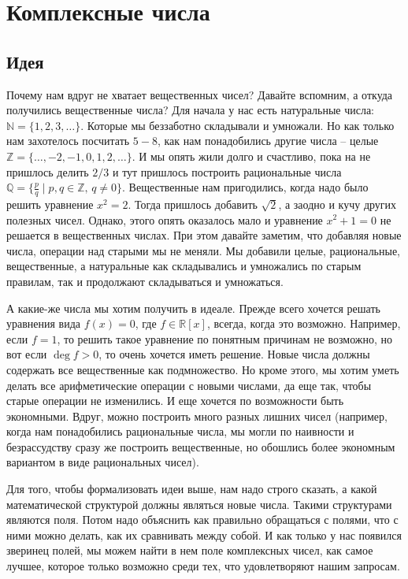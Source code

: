 \newpage
\section{Комплексные числа}

\subsection{Идея}

Почему нам вдруг не хватает вещественных чисел?
Давайте вспомним, а откуда получились вещественные числа?
Для начала у нас есть натуральные числа: $\mathbb N = \{1,2,3,\ldots\}$.
Которые мы беззаботно складывали и умножали.
Но как только нам захотелось посчитать $5 - 8$, как нам понадобились другие числа -- целые $\mathbb Z = \{\ldots, -2, -1,0,1,2,\ldots\}$.
И мы опять жили долго и счастливо, пока на не пришлось делить $2/3$ и тут пришлось построить рациональные числа $\mathbb Q = \{\frac{p}{q}\mid p,q\in \mathbb Z,\, q\neq 0\}$.
Вещественные нам пригодились, когда надо было решить уравнение $x^2 = 2$.
Тогда пришлось добавить $\sqrt{2}$, а заодно и кучу других полезных чисел.
Однако, этого опять оказалось мало и уравнение $x^2 +1 = 0$ не решается в вещественных числах.
При этом давайте заметим, что добавляя новые числа, операции над старыми мы не меняли.
Мы добавили целые, рациональные, вещественные, а натуральные как складывались и умножались по старым правилам, так и продолжают складываться и умножаться.

А какие-же числа мы хотим получить в идеале.
Прежде всего хочется решать уравнения вида $f(x) = 0$, где $f\in \mathbb R[x]$, всегда, когда это возможно.
Например, если $f = 1$, то решить такое уравнение по понятным причинам не возможно, но вот если $\deg f > 0$, то очень хочется иметь решение.
Новые числа должны содержать все вещественные как подмножество.
Но кроме этого, мы хотим уметь делать все арифметические операции с новыми числами, да еще так, чтобы старые операции не изменились.
И еще хочется по возможности быть экономными.
Вдруг, можно построить много разных лишних чисел (например, когда нам понадобились рациональные числа, мы могли по наивности и безрассудству сразу же построить вещественные, но обошлись более экономным вариантом в виде рациональных чисел).

Для того, чтобы формализовать идеи выше, нам надо строго сказать, а какой математической структурой должны являться новые числа.
Такими структурами являются поля.
Потом надо объяснить как правильно обращаться с полями, что с ними можно делать, как их сравнивать между собой.
И как только у нас появился зверинец полей, мы можем найти в нем поле комплексных чисел, как самое лучшее, которое только возможно среди тех, что удовлетворяют нашим запросам.


